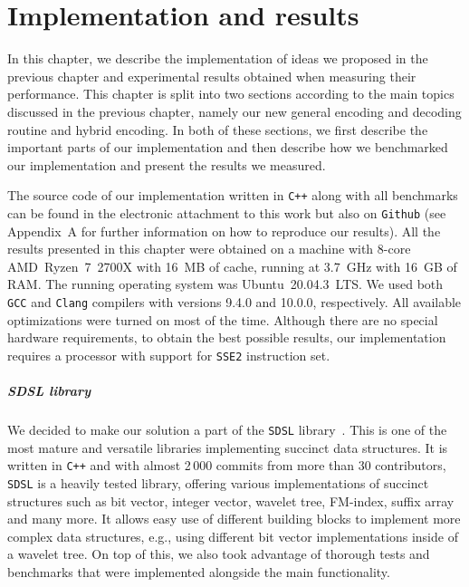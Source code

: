 \chapter{Implementation and results}
\label{kap:kap4}

In this chapter, we describe the implementation of ideas we proposed in the previous
chapter and experimental results obtained when measuring their performance.
This chapter is split into two sections according to the main topics discussed
in the previous chapter, namely our new general encoding and decoding routine and hybrid
encoding. In both of these sections, we first describe the important parts of our
implementation and then describe how we benchmarked our implementation and present the
results we measured.

The source code of our implementation written in \texttt{C++} along with all benchmarks can
be found in the electronic attachment to this work but also on \texttt{Github} (see Appendix~A
for further information on how to reproduce our results). All the results presented in this
chapter were obtained on a machine with 8-core AMD~Ryzen~7~2700X with 16~MB of cache, running
at 3.7~GHz with 16~GB of RAM. The running operating system was Ubuntu~20.04.3~LTS. We used both
\texttt{GCC} and \texttt{Clang} compilers with versions 9.4.0 and 10.0.0, respectively. All
available optimizations were turned on most of the time. Although there are no special hardware
requirements, to obtain the best possible results, our implementation requires a processor with
support for \texttt{SSE2} instruction set.

\paragraph{SDSL library}

We decided to make our solution a part of the \texttt{SDSL} library~\citep{gog2014theory}. This
is one of the most mature and versatile libraries implementing succinct data structures. It is
written in \texttt{C++} and with almost 2\,000 commits from more than 30 contributors, \texttt{SDSL}
is a heavily tested library, offering various implementations of succinct structures such as
bit vector, integer vector, wavelet tree, FM-index, suffix array and many more. It allows easy use
of different building blocks to implement more complex data structures, e.g., using different bit vector
implementations inside of a wavelet tree. On top of this, we also took advantage of thorough tests
and benchmarks that were implemented alongside the main functionality.

